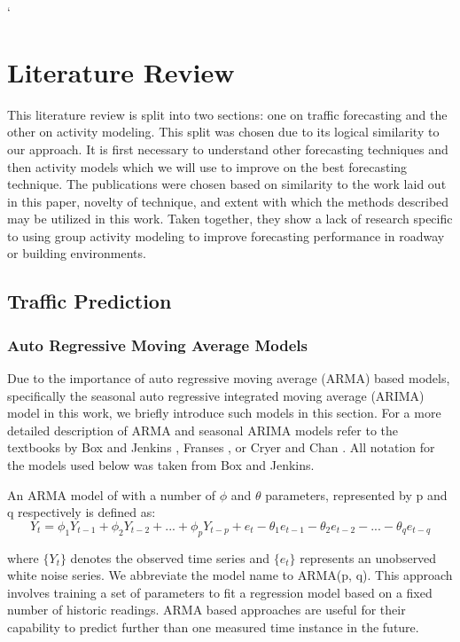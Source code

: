 `\chapter{Literature Review}
	This literature review is split into two sections: one on traffic forecasting and the other on activity modeling.  This split was chosen due to its logical similarity to our approach.  It is first necessary to understand other forecasting techniques and then activity models which we will use to improve on the best forecasting technique.  The publications were chosen based on similarity to the work laid out in this paper, novelty of technique, and extent with which the methods described may be utilized in this work.  Taken together, they show a lack of research specific to using group activity modeling to improve forecasting performance in roadway or building environments.

\section{Traffic Prediction}

\subsection{Auto Regressive Moving Average Models}
Due to the importance of auto regressive moving average (ARMA) based models, specifically the seasonal auto regressive integrated moving average (ARIMA) model in this work, we briefly introduce such models in this section.  For a more detailed description of ARMA and seasonal ARIMA models refer to the textbooks by Box and Jenkins \cite{Box2008}, Franses \cite{Franses1998}, or Cryer and Chan \cite{Cryer2008}.  All notation for the models used below was taken from Box and Jenkins.

An ARMA model of with a number of $\phi$ and $\theta$ parameters, represented by p and q respectively is defined as: 
\begin{equation}
Y_{t} = \phi_{1}Y_{t-1} + \phi_{2}Y_{t-2} + ... + \phi_{p}Y_{t-p} + e_{t} - \theta_{1}e_{t-1} - \theta_{2}e_{t-2} - ... - \theta_{q}e_{t-q}
\end{equation}

\noindent
where $\{Y_{t}\}$ denotes the observed time series and $\{e_t\}$ represents an unobserved white noise series.  We abbreviate the model name to ARMA(p, q).  This approach involves training a set of parameters to fit a regression model based on a fixed number of historic readings.  ARMA based approaches are useful for their capability to predict further than one measured time instance in the future.    

